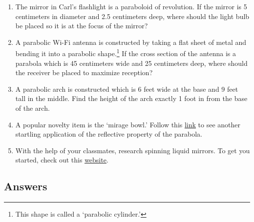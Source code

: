 \begin{enumerate}
\setcounter{enumi}{\value{HW}}

\item  The mirror in Carl's flashlight is a paraboloid of revolution.  If the mirror is 5 centimeters in diameter and 2.5 centimeters deep, where should the light bulb be placed so it is at the focus of the mirror?

\item  A parabolic Wi-Fi antenna is constructed by taking a flat sheet of metal and bending it into a parabolic shape.\footnote{This shape is called a `parabolic cylinder.'}  If the cross section of the antenna is a parabola which is 45 centimeters wide and 25 centimeters deep, where should the receiver be placed to maximize reception?

\item  \label{parabolaarch} A parabolic arch is constructed which is 6 feet wide at the base and 9 feet tall in the middle. Find the height of the arch exactly 1 foot in from the base of the arch. 

\item  A popular novelty item is the `mirage bowl.'  Follow this  \href{http://spie.org/etop/2007/etop07methodsV.pdf}{\underline{link}} to see another startling application of the reflective property of the parabola.

\item With the help of your classmates, research spinning liquid mirrors.  To get you started, check out this \href{http://www.astro.ubc.ca/LMT/lzt/}{\underline{website}}.

\end{enumerate}

\newpage

\subsection{Answers}

